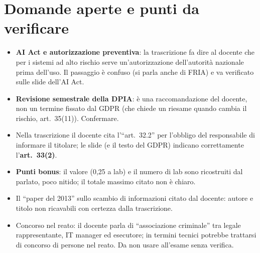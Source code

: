 \section{Domande aperte e punti da verificare}
\begin{verifica}
\begin{itemize}
  \item \textbf{AI Act e autorizzazione preventiva}: la trascrizione fa dire al docente che per i
    sistemi ad alto rischio serve un'autorizzazione dell'autorità nazionale prima dell'uso. Il passaggio
    è confuso (si parla anche di FRIA) e va verificato sulle slide dell'AI Act.
  \item \textbf{Revisione semestrale della DPIA}: è una raccomandazione del docente, non un termine
    fissato dal GDPR (che chiede un riesame quando cambia il rischio, art.~35(11)). Confermare.
  \item Nella trascrizione il docente cita l'``art.~32.2'' per l'obbligo del responsabile di informare
    il titolare; le slide (e il testo del GDPR) indicano correttamente l'\textbf{art.~33(2)}.
  \item \textbf{Punti bonus}: il valore (0,25 a lab) e il numero di lab sono ricostruiti dal parlato,
    poco nitido; il totale massimo citato non è chiaro.
  \item Il ``paper del 2013'' sullo scambio di informazioni citato dal docente: autore e titolo non
    ricavabili con certezza dalla trascrizione.
  \item Concorso nel reato: il docente parla di ``associazione criminale'' tra legale rappresentante,
    IT manager ed esecutore; in termini tecnici potrebbe trattarsi di concorso di persone nel reato.
    Da non usare all'esame senza verifica.
\end{itemize}
\end{verifica}
